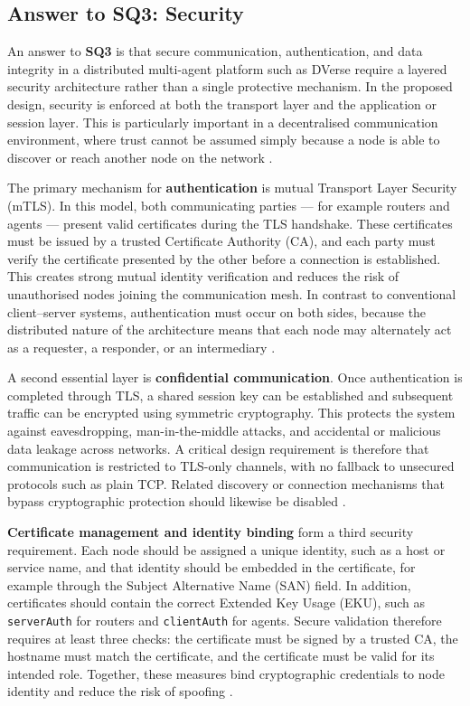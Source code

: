 \documentclass[11pt]{article}
\begin{document}
\subsection{Answer to SQ3: Security}

An answer to \textbf{SQ3} is that secure communication, authentication, and data integrity in a distributed multi-agent platform such as DVerse require a layered security architecture rather than a single protective mechanism. In the proposed design, security is enforced at both the transport layer and the application or session layer. This is particularly important in a decentralised communication environment, where trust cannot be assumed simply because a node is able to discover or reach another node on the network \cite{mitev2026}.

The primary mechanism for \textbf{authentication} is mutual Transport Layer Security (mTLS). In this model, both communicating parties --- for example routers and agents --- present valid certificates during the TLS handshake. These certificates must be issued by a trusted Certificate Authority (CA), and each party must verify the certificate presented by the other before a connection is established. This creates strong mutual identity verification and reduces the risk of unauthorised nodes joining the communication mesh. In contrast to conventional client--server systems, authentication must occur on both sides, because the distributed nature of the architecture means that each node may alternately act as a requester, a responder, or an intermediary \cite{mitev2026}.

A second essential layer is \textbf{confidential communication}. Once authentication is completed through TLS, a shared session key can be established and subsequent traffic can be encrypted using symmetric cryptography. This protects the system against eavesdropping, man-in-the-middle attacks, and accidental or malicious data leakage across networks. A critical design requirement is therefore that communication is restricted to TLS-only channels, with no fallback to unsecured protocols such as plain TCP. Related discovery or connection mechanisms that bypass cryptographic protection should likewise be disabled \cite{mitev2026}.

\textbf{Certificate management and identity binding} form a third security requirement. Each node should be assigned a unique identity, such as a host or service name, and that identity should be embedded in the certificate, for example through the Subject Alternative Name (SAN) field. In addition, certificates should contain the correct Extended Key Usage (EKU), such as \texttt{serverAuth} for routers and \texttt{clientAuth} for agents. Secure validation therefore requires at least three checks: the certificate must be signed by a trusted CA, the hostname must match the certificate, and the certificate must be valid for its intended role. Together, these measures bind cryptographic credentials to node identity and reduce the risk of spoofing \cite{mitev2026}.
\end{document}
